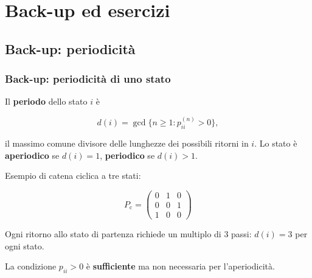 

\section{Back-up ed esercizi}

\subsection{Back-up: periodicit\`{a}}%

\begin{frame}%
%

\frametitle{Back-up: periodicit\`{a} di uno stato}%
%

%


Il \textbf{periodo} dello stato $i$ \`{e}%

\[
d(i) = \gcd\{ n\geq1 : p_{ii}^{(n)}>0 \},
\]


il massimo comune divisore delle lunghezze dei possibili ritorni in $i$. Lo
stato \`{e} \textbf{aperiodico} se $d(i)=1$, \textbf{periodico} se $d(i)>1$.

\medskip

Esempio di catena ciclica a tre stati:%

\[
P_{\mathrm{c}} =
\begin{pmatrix}
0 & 1 & 0\\
0 & 0 & 1\\
1 & 0 & 0
\end{pmatrix}
\]


\medskip

\begin{stepitemize}
\item Ogni ritorno allo stato di partenza richiede un multiplo di $3$ passi:
$d(i)=3$ per ogni stato.

\item La condizione $p_{ii}>0$ \`{e} \textbf{sufficiente} ma non necessaria
per l'aperiodicit\`{a}.
\end{stepitemize}

%

\transboxout
\end{frame}%


